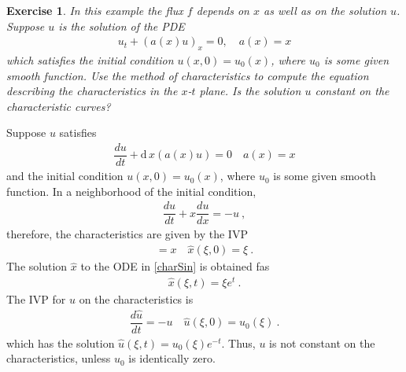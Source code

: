 \documentclass[10pt,letterpaper]{article}
\newcommand{\dif}[1][]{\mathrm{d} {#1}\,}
\newcommand{\rb}[1]{ \left(  {#1} \right) }
\newcommand{\frb}[1]{ \left(  {#1} \right) }
\theoremstyle{break}
\newtheorem{exercise}{Exercise}
\begin{document}
\begin{exercise}
	In this example the flux $f$ depends on $x$ as well as on the solution $u$.
	Suppose $u$ is the solution of the PDE
	\begin{gather}%
		u_t +\rb{a(x)u}_x=0,
		\quad
		a(x)= x
	\end{gather}%
	which satisfies the initial condition $u(x,0)=u_0(x)$, where $u_0$ is some given smooth function.
	Use the method of characteristics to compute the equation describing the characteristics in the $x$-$t$ plane.
	Is the solution $u$ constant on the characteristic curves?
\end{exercise}

\begin{solution}
	Suppose $u$ satisfies
	\begin{gather}
		\dfrac{du}{dt}+\dif{}{x}\rb{a(x)u}=0
		\quad
		a(x)=x
	\end{gather}
	and the initial condition $u(x,0)=u_0(x)$, where $u_0$ is some given smooth function.
	In a neighborhood of the initial condition,
	\begin{gather}
		\dfrac{du}{dt}+x \dfrac{du}{dx}=-u\ ,
	\end{gather}
	therefore, the characteristics are given by the IVP
	\begin{gather} \label{charSin}
		=x
		\quad
		\hat x\frb{\xi,0}=\xi\ .
	\end{gather}
	The solution $\hat x$ to the ODE in \eqref{charSin} is obtained fas
	\begin{gather}
		\hat x\frb{\xi,t}=\xi e^t\ .
	\end{gather}
	The IVP for $u$ on the characteristics is
	\begin{gather}
		\dfrac{d\hat u}{dt}=-u
		\quad
		\hat u\frb{\xi,0}=u_0\frb{\xi}\ .
	\end{gather}
	which has the solution $\hat u(\xi,t) = u_0(\xi) e^{-t}$. Thus, $u$ is not constant on the characteristics, unless $u_0$ is identically zero.	
\end{solution}
\end{document}
